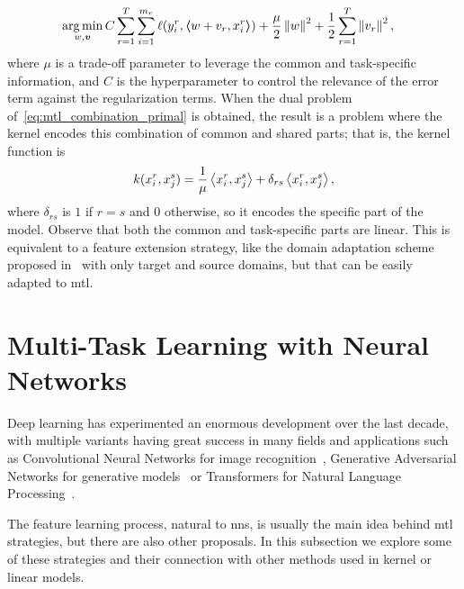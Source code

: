 \begin{equation}
    \label{eq:mtl_combination_primal}
    \begin{aligned}
        &\argmin_{w, \fv{v}} C \sum_{r=1}^\ntasks \sum_{i=1}^{\npertask_r} \lossf(y_i^r, \dotp{w + v_r}{x_i^r}) + \frac{\mu}{2}  \norm{w}^2 + \frac{1}{2} \sum_{r=1}^\ntasks \norm{v_r}^2 ,
    \end{aligned}    
\end{equation}
where $\mu$ is a trade-off parameter to leverage the common and task-specific information, and $C$ is the hyperparameter to control the relevance of the error term against the regularization terms.
%
When the dual problem of~\eqref{eq:mtl_combination_primal} is obtained, the result is a problem where the kernel encodes this combination of common and shared parts; that is, the kernel function is
\begin{equation}
    \nonumber
    k(x_i^r, x_j^s) = \frac{1}{\mu} \bm{\left\langle} x_i^r, x_j^s \bm{\right\rangle} +  \delta_{rs} \bm{\left\langle} x_i^r, x_j^s \bm{\right\rangle} ,
\end{equation}
where $\delta_{rs}$ is $1$ if $r=s$ and $0$ otherwise, so it encodes the specific part of the model. 
Observe that both the common and task-specific parts are linear.
This is equivalent to a feature extension strategy, like the domain adaptation scheme proposed in~\cite{Daume07} with only target and source domains, but that can be easily adapted to \acrshort{mtl}.




\section{Multi-Task Learning with Neural Networks}\label{sec:deep_mtl}
Deep learning has experimented an enormous development over the last decade, with multiple variants having great success in many fields and applications such as Convolutional Neural Networks for image recognition~\citep*{KrizhevskySH12}, Generative Adversarial Networks for generative models~\citep{GoodfellowPMXWOCB14} or Transformers for Natural Language Processing~\citep{VaswaniSPUJGKP17}. 

The feature learning process, natural to \acrshort{nns}, is usually the main idea behind \acrshort{mtl} strategies, but there are also other proposals.
In this subsection we explore some of these strategies and their connection with other methods used in kernel or linear models.

